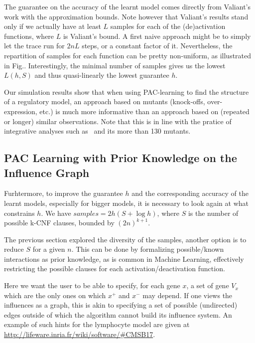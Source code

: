 \documentclass{llncs}
\begin{document}
The guarantee on the accuracy of the learnt model comes directly
from Valiant's work with the approximation bounds. Note however that
Valiant's results stand only if we actually have
at least $L$ samples for each of the (de)activation functions, where $L$ is
Valiant's bound. A first naive approach might be to simply let the trace run
for $2nL$ steps, or a constant factor of it. Nevertheless, the repartition of
samples for each function can be pretty non-uniform, as illustrated in
Fig.. Interestingly, the minimal number of samples gives us the lowest
$L(h, S)$ and thus quasi-linearly the lowest guarantee $h$.


Our simulation results show that when using PAC-learning to find the structure of a
regulatory model, an approach based on mutants (knock-offs, over-expression, etc.) is
much more informative than an approach based on (repeated or longer) similar
observations. Note that this is in line with the pratice of integrative analyses
such as~\cite{CCCCNT04mbc} and its more than 130 mutants.


\subsection{PAC Learning with Prior Knowledge on the Influence Graph}
\label{sec:prior}

Furhtermore, to improve the guarantee $h$ and the corresponding accuracy of the learnt
models, especially for bigger models, it is necessary to look again at what
constrains $h$. We have \(samples = 2h(S + \log h)\), where $S$ is the number
of possible k-CNF clauses, bounded by $(2n)^{k+1}$.

The previous section explored the diversity of the samples, another option is
to reduce $S$ for a given $n$. This can be done by formalizing possible/known
interactions as prior knowledge, as is common in Machine Learning, effectively
restricting the possible clauses for each activation/deactivation function.

Here we want the user to be able to specify, for each gene $x$, a set of gene
$V_x$ which are the only ones on which $x^+$ and $x^-$ may depend. If one
views the influences as a graph, this is akin to specifying a set of possible
(undirected) edges outside of which the algorithm cannot build its influence
system. An example of such hints for the lymphocyte model are given at
\url{http://lifeware.inria.fr/wiki/software/\#CMSB17}.
\end{document}
